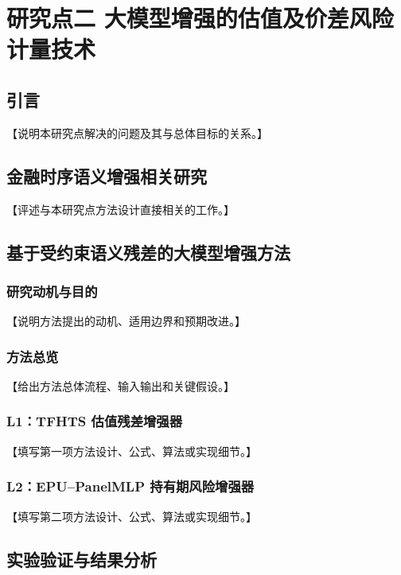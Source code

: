 \chapter{研究点二 大模型增强的估值及价差风险计量技术}

\section{引言}

【说明本研究点解决的问题及其与总体目标的关系。】

\section{金融时序语义增强相关研究}

【评述与本研究点方法设计直接相关的工作。】

\section{基于受约束语义残差的大模型增强方法}

\subsection{研究动机与目的}

【说明方法提出的动机、适用边界和预期改进。】

\subsection{方法总览}

【给出方法总体流程、输入输出和关键假设。】

\subsection{L1：TFHTS 估值残差增强器}

【填写第一项方法设计、公式、算法或实现细节。】

\subsection{L2：EPU--PanelMLP 持有期风险增强器}

【填写第二项方法设计、公式、算法或实现细节。】

\section{实验验证与结果分析}

